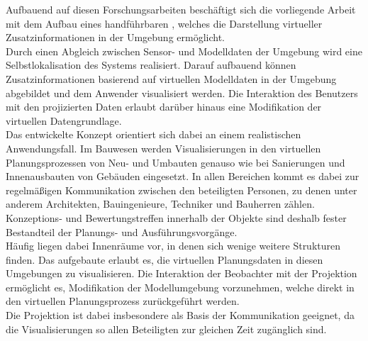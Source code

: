 Aufbauend auf diesen Forschungsarbeiten beschäftigt sich die vorliegende Arbeit mit dem Aufbau eines handführbaren , welches die Darstellung virtueller Zusatzinformationen in der Umgebung ermöglicht.\\
Durch einen Abgleich zwischen Sensor- und Modelldaten der Umgebung wird eine Selbstlokalisation des Systems realisiert. Darauf aufbauend können Zusatzinformationen basierend auf virtuellen Modelldaten in der Umgebung abgebildet und dem Anwender visualisiert werden. Die Interaktion des Benutzers mit den projizierten Daten erlaubt darüber hinaus eine Modifikation der virtuellen Datengrundlage.\\

Das entwickelte Konzept orientiert sich dabei an einem realistischen Anwendungsfall. Im Bauwesen werden Visualisierungen in den virtuellen Planungsprozessen von Neu- und Umbauten genauso wie bei Sanierungen und Innenausbauten von Gebäuden eingesetzt. In allen Bereichen kommt es dabei zur regelmäßigen Kommunikation zwischen den beteiligten Personen, zu denen unter anderem Architekten, Bauingenieure, Techniker und Bauherren zählen. Konzeptions- und Bewertungstreffen innerhalb der Objekte sind deshalb fester Bestandteil der Planungs- und Ausführungsvorgänge.\\
Häufig liegen dabei Innenräume vor, in denen sich wenige weitere Strukturen finden. Das aufgebaute \kps{} erlaubt es, die virtuellen Planungsdaten in diesen Umgebungen zu visualisieren. Die Interaktion der Beobachter mit der Projektion ermöglicht es, Modifikation der Modellumgebung vorzunehmen, welche direkt in den virtuellen Planungsprozess zurückgeführt werden.\\
Die Projektion ist dabei insbesondere als Basis der Kommunikation geeignet, da die Visualisierungen so allen Beteiligten zur gleichen Zeit zugänglich sind.\\

